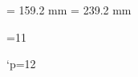 
\immediate\message{\string\hsize=159.2 mm \string\vsize=239.2 mm}

\hsize= 159.2 mm
\vsize= 239.2 mm

{=11                          %

\gdef\m@g{\mag\count@
  \hsize=159.2truemm \vsize=239.2truemm \dimen\footins8truein
  \ifx\pdfpagewidth\undefined\else     %
     \recount@true\pdfpagewidth     %
     \recount@true\pdfpageheight    %
     \ifx\pdfhorigin\undefined\else %
        \recount@true\pdfhorigin
        \recount@true\pdfvorigin
  \fi\fi
}
\gdef\recount@true#1{#1=\expandafter\recount@trueA\the#1truept\relax}
{\catcode`p=12 \gdef\recount@trueA#1p#2{#1}}

}

